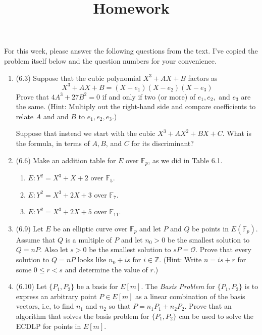 \documentclass[12pt]{amsart}
\theoremstyle{definition}
\begin{document}
\title{Homework}

\maketitle

For this week, please answer the following questions from the text. 
I've copied the problem itself below and the question numbers for 
your convenience. 

\begin{enumerate}
	\item (6.3) Suppose that the cubic polynomial $X^3 + AX + B$ factors 
		as 
	\begin{displaymath}
		X^3 + AX + B = (X-e_1)(X-e_2)(X-e_3)
	\end{displaymath}
		Prove that $4A^3+27B^2 = 0$ if and only if two (or more) of 
		$e_1,e_2,$ and $e_3$ are the same. (Hint: Multiply out the 
		right-hand side and compare coefficients to relate $A$ and 
		and $B$ to $e_1,e_2,e_3.$) 

		Suppose that instead we start with the cubic $X^3 + AX^2 + 
		BX + C$. What is the formula, in terms of $A, B$, and $C$ 
		for its discriminant? 

	\item (6.6) Make an addition table for $E$ over $\mathbb{F}_p$, 
		as we did in Table 6.1. 
	\begin{enumerate}
		\item $E: Y^2 = X^3 + X + 2$ over $\mathbb{F}_5$.
		\item $E: Y^2 = X^3 + 2X + 3$ over $\mathbb{F}_7$.
		\item $E: Y^2 = X^3 + 2X + 5$ over $\mathbb{F}_{11}$.
	\end{enumerate}

	\item (6.9) Let $E$ be an elliptic curve over $\mathbb{F}_p$ and let 
		$P$ and $Q$ be points in $E(\mathbb{F}_p)$. Assume that $Q$ 
		is a multiple of $P$ and let $n_0 > 0$ be the smallest solution 
		to $Q = nP$. Also let $s>0$ be the smallest solution to $sP = 
		\mathcal O$. Prove that every solution to $Q = nP$ looks like 
		$n_0 + is$ for $i \in \mathbb{Z}$. (Hint: Write $n = is + r$ for 
		some $0 \leq r < s$ and determine the value of $r$.)

	\item (6.10) Let $\lbrace P_1,P_2 \rbrace$ be a basis for $E[m]$. The 
		\textit{Basis Problem} for $\lbrace P_1,P_2 \rbrace$ is to 
		express an arbitrary point $P \in E[m]$ as a linear combination 
		of the basis vectors, i.e, to find $n_1$ and $n_2$ so that $P = 
		n_1P_1 + n_2P_2$. Prove that an algorithm that solves the 
		basis problem for $\lbrace P_1,P_2 \rbrace$ can be used to 
		solve the ECDLP for points in $E[m]$.
		

\end{enumerate}
\end{document}
